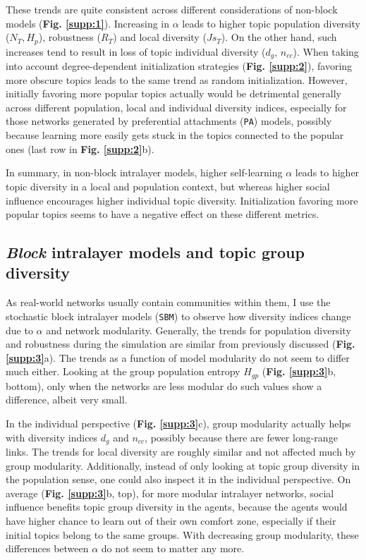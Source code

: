 \documentclass{svproc}
\begin{document}
These trends are quite consistent across different considerations of non-block models (\textbf{Fig. \ref{supp:1}}). Increasing in $\alpha$ leads to higher topic population diversity ($N_T, H_p$), robustness ($R_T$) and local diversity ($Js_T$). On the other hand, such increases tend to result in loss of topic individual diversity ($d_g$, $n_{cc}$). When taking into account degree-dependent initialization strategies (\textbf{Fig. \ref{supp:2}}), favoring more obscure topics leads to the same trend as random initialization. However, initially favoring more popular topics actually would be detrimental generally across different population, local and individual diversity indices, especially for those networks generated by preferential attachments (\texttt{PA}) models, possibly because learning more easily gets stuck in the topics connected to the popular ones (last row in \textbf{Fig. \ref{supp:2}}b).


In summary, in non-block intralayer models, higher self-learning $\alpha$ leads to higher topic diversity in a local and population context, but whereas higher social influence encourages higher individual topic diversity. Initialization favoring more popular topics seems to have a negative effect on these different metrics.



\subsection{\textit{Block} intralayer models and topic group diversity}
\label{results-block}

As real-world networks usually contain communities within them, I use the stochastic block intralayer models (\texttt{SBM}) to observe how diversity indices change due to $\alpha$ and network modularity. Generally, the trends for population diversity and robustness during the simulation are similar from previously discussed (\textbf{Fig. \ref{supp:3}}a). The trends as a function of model modularity do not seem to differ much either. Looking at the group population entropy $H_{gp}$ (\textbf{Fig. \ref{supp:3}}b, bottom), only when the networks are less modular do such values show a difference, albeit very small.

In the individual perspective (\textbf{Fig. \ref{supp:3}}c), group modularity actually helps with diversity indices $d_g$ and $n_{cc}$, possibly because there are fewer long-range links. The trends for local diversity are roughly similar and not affected much by group modularity. Additionally, instead of only looking at topic group diversity in the population sense, one could also inspect it in the individual perspective. On average (\textbf{Fig. \ref{supp:3}}b, top), for more modular intralayer networks, social influence benefits topic group diversity in the agents, because the agents would have higher chance to learn out of their own comfort zone, especially if their initial topics belong to the same groups. With decreasing group modularity, these differences between $\alpha$ do not seem to matter any more.
\end{document}
